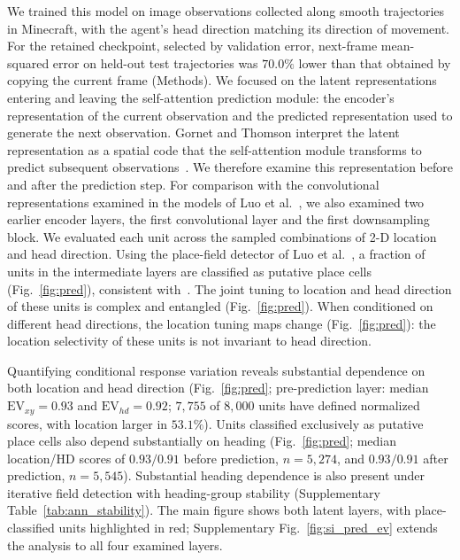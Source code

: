 \documentclass[11pt]{article}
\begin{document}
We trained this model on image observations collected along smooth trajectories in Minecraft, with the agent's head direction matching its direction of movement. For the retained checkpoint, selected by validation error, next-frame mean-squared error on held-out test trajectories was $70.0\%$ lower than that obtained by copying the current frame (Methods). We focused on the latent representations entering and leaving the self-attention prediction module: the encoder's representation of the current observation and the predicted representation used to generate the next observation. Gornet and Thomson interpret the latent representation as a spatial code that the self-attention module transforms to predict subsequent observations~\cite{Gornet2024automated}. We therefore examine this representation before and after the prediction step. For comparison with the convolutional representations examined in the models of Luo et al.~\cite{Luo2024}, we also examined two earlier encoder layers, the first convolutional layer and the first downsampling block. We evaluated each unit across the sampled combinations of 2-D location and head direction.
Using the place-field detector of Luo et al.~\cite{Luo2024}, a fraction of units in the intermediate layers are classified as putative place cells (Fig.~\ref{fig:pred}), consistent with~\cite{Gornet2024automated}. The joint tuning to location and head direction of these units is complex and entangled (Fig.~\ref{fig:pred}). When conditioned on different head directions, the location tuning maps change (Fig.~\ref{fig:pred}): the location selectivity of these units is not invariant to head direction.

Quantifying conditional response variation reveals substantial dependence on both location and head direction (Fig.~\ref{fig:pred}; pre-prediction layer: median $\mathrm{EV}_{xy}=0.93$ and $\mathrm{EV}_{hd}=0.92$; $7{,}755$ of $8{,}000$ units have defined normalized scores, with location larger in $53.1\%$). Units classified exclusively as putative place cells also depend substantially on heading (Fig.~\ref{fig:pred}; median location/HD scores of $0.93/0.91$ before prediction, $n=5{,}274$, and $0.93/0.91$ after prediction, $n=5{,}545$). Substantial heading dependence is also present under iterative field detection with heading-group stability (Supplementary Table~\ref{tab:ann_stability}). The main figure shows both latent layers, with place-classified units highlighted in red; Supplementary Fig.~\ref{fig:si_pred_ev} extends the analysis to all four examined layers.
\end{document}
